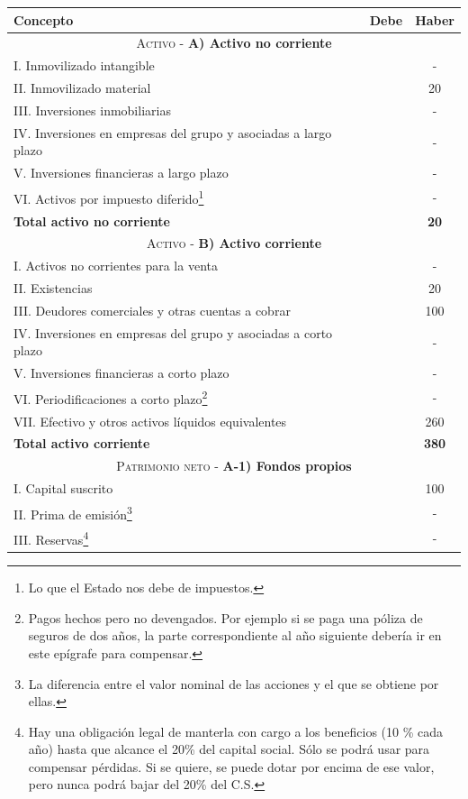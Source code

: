 \documentclass[nochap,palatino,notitlepage]{apuntes}
\begin{document}
\begin{table}[hbtp]
\begin{minipage}{\textwidth}
\footnotesize
\centering
\begin{tabular}{l|c|c}
\textbf{Concepto} & \textbf{Debe} & \textbf{Haber} \\ \toprule
\multicolumn{3}{c}{\textsc{Activo} - \textbf{A) Activo no corriente}} \\ \midrule
I. Inmovilizado intangible & & - \\
II. Inmovilizado material & & 20 \\
III. Inversiones inmobiliarias & & - \\
IV. Inversiones en empresas del grupo y asociadas a largo plazo & & - \\
V. Inversiones financieras a largo plazo & & - \\
VI. Activos por impuesto diferido\footnote{Lo que el Estado nos debe de impuestos.} & & - \\
\textbf{Total activo no corriente} & & \textbf{20} \\ \midrule
\multicolumn{3}{c}{\textsc{Activo} - \textbf{B) Activo corriente}} \\ \midrule
I. Activos no corrientes para la venta & & - \\
II. Existencias & & 20 \\
III. Deudores comerciales y otras cuentas a cobrar & & 100 \\
IV. Inversiones en empresas del grupo y asociadas a corto plazo & & - \\
V. Inversiones financieras a corto plazo & & - \\
VI. Periodificaciones a corto plazo\footnote{Pagos hechos pero no devengados. Por ejemplo si se paga una póliza de seguros de dos años, la parte correspondiente al año siguiente debería ir en este epígrafe para compensar.} & & - \\
VII. Efectivo y otros activos líquidos equivalentes & & 260 \\
\textbf{Total activo corriente} & & \textbf{380} \\ \midrule
\multicolumn{3}{c}{\textsc{Patrimonio neto} - \textbf{A-1) Fondos propios}} \\ \midrule
I. Capital suscrito & & 100 \\
II. Prima de emisión\footnote{La diferencia entre el valor nominal de las acciones y el que se obtiene por ellas.} & & - \\
III. Reservas\footnote{Hay una obligación legal de manterla con cargo a los beneficios (10 \% cada año) hasta que alcance el 20\% del capital social. Sólo se podrá usar para compensar pérdidas. Si se quiere, se puede dotar por encima de ese valor, pero nunca podrá bajar del 20\% del C.S.} & & - \\

\end{tabular}
\end{minipage}
\end{table}
\end{document}
